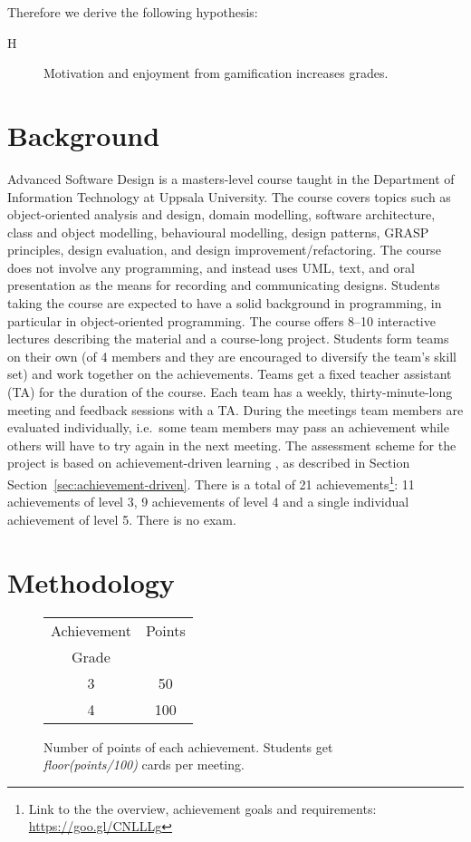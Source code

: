 \documentclass[sigconf]{acmart}
\begin{document}
Therefore we derive the following hypothesis:

\begin{description}
\item[H] Motivation and enjoyment from gamification increases grades.
\end{description}

\hypertarget{background}{%
\section{Background}\label{background}}

Advanced Software Design is a masters-level course taught in the
Department of Information Technology at Uppsala University. The course
covers topics such as object-oriented analysis and design, domain
modelling, software architecture, class and object modelling,
behavioural modelling, design patterns, GRASP principles, design
evaluation, and design improvement/refactoring. The course does not
involve any programming, and instead uses UML, text, and oral
presentation as the means for recording and communicating designs.
Students taking the course are expected to have a solid background in
programming, in particular in object-oriented programming. The course
offers 8--10 interactive lectures describing the material and a
course-long project. Students form teams on their own (of 4 members and
they are encouraged to diversify the team's skill set) and work together
on the achievements. Teams get a fixed teacher assistant (TA) for the
duration of the course. Each team has a weekly, thirty-minute-long
meeting and feedback sessions with a TA. During the meetings team
members are evaluated individually, i.e.~some team members may pass an
achievement while others will have to try again in the next meeting. The
assessment scheme for the project is based on achievement-driven
learning \citep{wrigstad2017mastery}, as described in Section
Section~\ref{sec:achievement-driven}. There is a total of 21
achievements\footnote{Link to the the overview, achievement goals and requirements: \url{https://goo.gl/CNLLLg}}:
11 achievements of level 3, 9 achievements of level 4 and a single
individual achievement of level 5. There is no exam.

\hypertarget{sec:methodology}{%
\section{Methodology}\label{sec:methodology}}

\begin{figure}[t]
\begin{tabular}{|c|c|}
\hline
Achievement & Points \\
Grade & \\
\hline
3 & 50 \\
\hline
4 & 100 \\
\hline
\end{tabular}
\caption{\label{fig:point-system}Number of points of each achievement. Students get \textit{floor(points/100)} cards per meeting.}
\end{figure}
\end{document}
